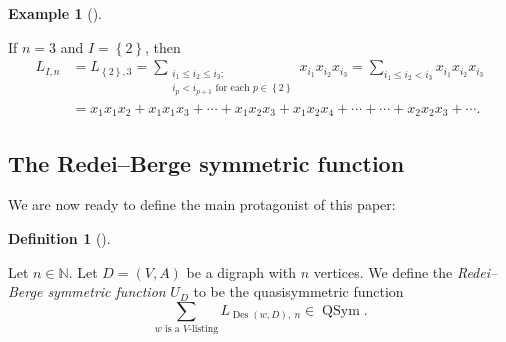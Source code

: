 \documentclass[numbers=enddot,12pt,final,onecolumn,notitlepage]{scrartcl}%
\numberwithin{exer}{section}
\theoremstyle{definition}
\newtheorem{defi}[theo]{Definition}
\newenvironment{definition}[1][]
{\begin{defi}[#1]\begin{leftbar}}
{\end{leftbar}\end{defi}}
\newtheorem{exam}[theo]{Example}
\newenvironment{example}[1][]
{\begin{exam}[#1]\begin{leftbar}}
{\end{leftbar}\end{exam}}
\let\sumnonlimits\sum
\renewcommand{\sum}{\sumnonlimits\limits}
\begin{document}
\begin{example}
If $n=3$ and $I=\left\{  2\right\}  $, then%
\begin{align*}
L_{I,n}  &  =L_{\left\{  2\right\}  ,3}=\sum_{\substack{i_{1}\leq i_{2}\leq
i_{3};\\i_{p}<i_{p+1}\text{ for each }p\in\left\{  2\right\}  }}x_{i_{1}%
}x_{i_{2}}x_{i_{3}}=\sum_{i_{1}\leq i_{2}<i_{3}}x_{i_{1}}x_{i_{2}}x_{i_{3}}\\
&  =x_{1}x_{1}x_{2}+x_{1}x_{1}x_{3}+\cdots+x_{1}x_{2}x_{3}+x_{1}x_{2}%
x_{4}+\cdots+\cdots+x_{2}x_{2}x_{3}+\cdots.
\end{align*}

\end{example}

\subsection{The Redei--Berge symmetric function}

We are now ready to define the main protagonist of this paper:

\begin{definition}
\label{def.UD}Let $n\in\mathbb{N}$. Let $D=\left(  V,A\right)  $ be a digraph
with $n$ vertices. We define the \emph{Redei--Berge symmetric function}
$U_{D}$ to be the quasisymmetric function%
\[
\sum_{w\text{ is a }V\text{-listing}}L_{\operatorname*{Des}\left(  w,D\right)
,\ n}\in\operatorname*{QSym}.
\]

\end{definition}
\end{document}

